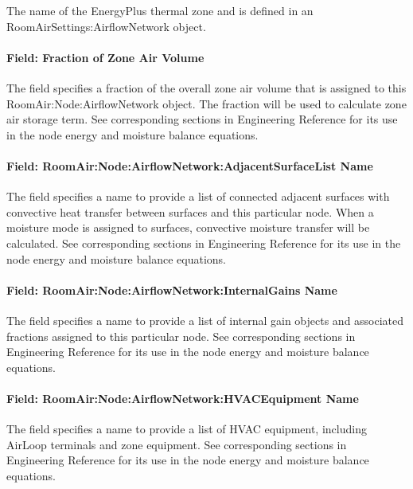 The name of the EnergyPlus thermal zone and is defined in an Room\-Air\-Settings:\-Air\-flow\-Net\-work object.

\paragraph{Field: Fraction of Zone Air Volume}\label{field-fraction-of-zone-air-volume}

The field specifies a fraction of the overall zone air volume that is assigned to this RoomAir:Node:AirflowNetwork object. The fraction will be used to calculate zone air storage term. See corresponding sections in Engineering Reference for its use in the node energy and moisture balance equations.

\paragraph{Field: RoomAir:Node:AirflowNetwork:AdjacentSurfaceList Name}\label{field-roomairnodeairflownetworkadjacentsurfacelist-name}

The field specifies a name to provide a list of connected adjacent surfaces with convective heat transfer between surfaces and this particular node. When a moisture mode is assigned to surfaces, convective moisture transfer will be calculated. See corresponding sections in Engineering Reference for its use in the node energy and moisture balance equations.

\paragraph{Field: RoomAir:Node:AirflowNetwork:InternalGains Name}\label{field-roomairnodeairflownetworkinternalgains-name}

The field specifies a name to provide a list of internal gain objects and associated fractions assigned to this particular node. See corresponding sections in Engineering Reference for its use in the node energy and moisture balance equations.

\paragraph{Field: RoomAir:Node:AirflowNetwork:HVACEquipment Name}\label{field-roomairnodeairflownetworkhvacequipment-name}

The field specifies a name to provide a list of HVAC equipment, including AirLoop terminals and zone equipment. See corresponding sections in Engineering Reference for its use in the node energy and moisture balance equations.

